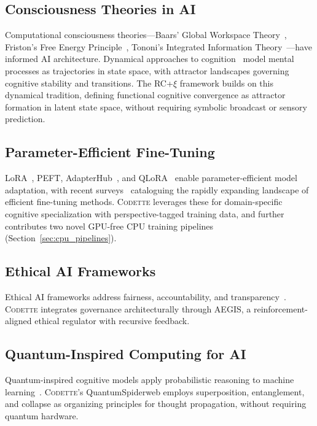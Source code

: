 \documentclass[11pt,a4paper]{article}
\newcommand{\rcxi}{RC+$\xi$}
\newcommand{\codette}{\textsc{Codette}}
\begin{document}
\subsection{Consciousness Theories in AI}
Computational consciousness theories---Baars' Global Workspace Theory~\citep{baars1997theatre}, Friston's Free Energy Principle~\citep{friston2010free}, Tononi's Integrated Information Theory~\citep{tononi2004information}---have informed AI architecture. Dynamical approaches to cognition~\citep{beer2000dynamical,kelso1995dynamic} model mental processes as trajectories in state space, with attractor landscapes governing cognitive stability and transitions. The \rcxi{} framework builds on this dynamical tradition, defining functional cognitive convergence as attractor formation in latent state space, without requiring symbolic broadcast or sensory prediction.

\subsection{Parameter-Efficient Fine-Tuning}
LoRA~\citep{hu2021lora}, PEFT, AdapterHub~\citep{pfeiffer2020adapterhub}, and QLoRA~\citep{dettmers2023qlora} enable parameter-efficient model adaptation, with recent surveys~\citep{lialin2023scaling} cataloguing the rapidly expanding landscape of efficient fine-tuning methods. \codette{} leverages these for domain-specific cognitive specialization with perspective-tagged training data, and further contributes two novel GPU-free CPU training pipelines (Section~\ref{sec:cpu_pipelines}).

\subsection{Ethical AI Frameworks}
Ethical AI frameworks address fairness, accountability, and transparency~\citep{mehrabi2021survey}. \codette{} integrates governance architecturally through AEGIS, a reinforcement-aligned ethical regulator with recursive feedback.

\subsection{Quantum-Inspired Computing for AI}
Quantum-inspired cognitive models apply probabilistic reasoning to machine learning~\citep{schuld2018supervised}. \codette{}'s QuantumSpiderweb employs superposition, entanglement, and collapse as organizing principles for thought propagation, without requiring quantum hardware.
\end{document}
